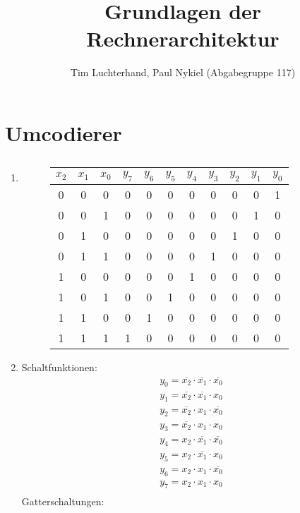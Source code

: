 \documentclass[DIN, pagenumber=false, fontsize=11pt, parskip=half]{scrartcl}
\title{Grundlagen der Rechnerarchitektur}
\author{Tim Luchterhand, Paul Nykiel (Abgabegruppe 117)}
\begin{document}
    \maketitle
    \section{Umcodierer}
    \subsection{}
    \begin{enumerate}[label=(\alph*)]
        \item
            \begin{figure}[H]
                \centering
                \begin{tabular}{ccc|cccccccc}
                    \toprule
                    $x_2$ &$x_1$ & $x_0$ & $y_7$ & $y_6$ & $y_5$ & $y_4$ & $y_3$ & $y_2$ & $y_1$ & $y_0$ \\
                    \midrule
                    0 & 0 & 0  &  0 & 0 & 0 & 0 & 0 & 0 & 0 & 1\\
                    0 & 0 & 1  &  0 & 0 & 0 & 0 & 0 & 0 & 1 & 0\\
                    0 & 1 & 0  &  0 & 0 & 0 & 0 & 0 & 1 & 0 & 0\\
                    0 & 1 & 1  &  0 & 0 & 0 & 0 & 1 & 0 & 0 & 0\\
                    1 & 0 & 0  &  0 & 0 & 0 & 1 & 0 & 0 & 0 & 0\\
                    1 & 0 & 1  &  0 & 0 & 1 & 0 & 0 & 0 & 0 & 0\\
                    1 & 1 & 0  &  0 & 1 & 0 & 0 & 0 & 0 & 0 & 0\\
                    1 & 1 & 1  &  1 & 0 & 0 & 0 & 0 & 0 & 0 & 0\\
                    \bottomrule
                \end{tabular}
            \end{figure}
        \item
            Schaltfunktionen:
            \begin{eqnarray*}
                y_0 = \overline{x_2} \cdot \overline{x_1} \cdot \overline{x_0} \\
                y_1 = \overline{x_2} \cdot \overline{x_1} \cdot x_0 \\
                y_2 = \overline{x_2} \cdot x_1 \cdot \overline{x_0} \\
                y_3 = \overline{x_2} \cdot x_1 \cdot x_0 \\
                y_4 = x_2 \cdot \overline{x_1} \cdot \overline{x_0} \\
                y_5 = x_2 \cdot \overline{x_1} \cdot x_0 \\
                y_6 = x_2 \cdot x_1 \cdot \overline{x_0} \\
                y_7 = x_2 \cdot x_1 \cdot x_0 \\
            \end{eqnarray*}
            Gatterschaltungen:
    \end{enumerate}
\end{document}
